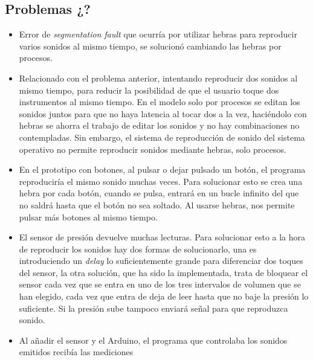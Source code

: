 \documentclass{article}
\begin{document}

    \subsection{Problemas ¿?} %
    \label{sub:Problemas}

        \begin{itemize}
            \item
            Error de \textit{segmentation fault} que ocurría por utilizar hebras para reproducir
            varios sonidos al mismo tiempo, se solucionó cambiando las hebras por procesos.
            \item
            Relacionado con el problema anterior, intentando reproducir dos sonidos al mismo tiempo, para reducir
            la posibilidad de que el usuario toque dos instrumentos al mismo tiempo. En el modelo solo por procesos
            se editan los sonidos juntos para que no haya latencia al tocar dos a la vez, haciéndolo con hebras se
            ahorra el trabajo de editar los sonidos y no hay combinaciones no contempladas. Sin embargo, el sistema
            de reproducción de sonido del sistema operativo no permite reproducir sonidos mediante hebras, solo
            procesos.
            \item
            En el prototipo con botones, al pulsar o dejar pulsado un botón, el programa reproduciría el mismo
            sonido muchas veces. Para solucionar esto se crea una hebra por cada botón, cuando se pulsa, entrará
            en un bucle infinito del que no saldrá hasta que el botón no sea soltado. Al usarse hebras, nos
            permite pulsar más botones al mismo tiempo.
            \item
            El sensor de presión devuelve muchas lecturas. Para solucionar esto a la hora de reproducir los sonidos
            hay dos formas de solucionarlo, una es introduciendo un \textit{delay} lo suficientemente grande para
            diferenciar dos toques del sensor, la otra solución, que ha sido la implementada, trata de bloquear el
            sensor cada vez que se entra en uno de los tres intervalos de volumen que se han elegido, cada vez que
            entra de deja de leer hasta que no baje la presión lo suficiente. Si la presión sube tampoco enviará
            señal para que reproduzca sonido.
            \item
            Al añadir el sensor y el Arduino, el programa que controlaba los sonidos emitidos recibía las mediciones

\end{itemize}
\end{document}
